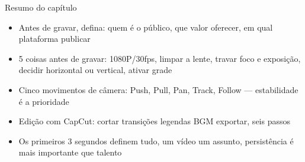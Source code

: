 \begin{tcbsummary}{Resumo do capítulo}
\begin{itemize}
  \item Antes de gravar, defina: quem é o público, que valor oferecer, em qual plataforma publicar
  \item 5 coisas antes de gravar: 1080P/30fps, limpar a lente, travar foco e exposição, decidir horizontal ou vertical, ativar grade
  \item Cinco movimentos de câmera: Push, Pull, Pan, Track, Follow — estabilidade é a prioridade
  \item Edição com CapCut: cortar transições legendas BGM exportar, seis passos
  \item Os primeiros 3 segundos definem tudo, um vídeo um assunto, persistência é mais importante que talento
\end{itemize}

\end{tcbsummary}
